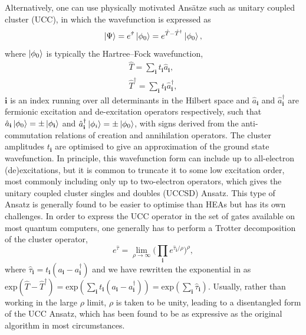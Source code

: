 \documentclass[%
 reprint,
 amsmath,amssymb,
 aps,
]{revtex4-2}
\begin{document}
Alternatively, one can use physically motivated Ans\"atze such as unitary coupled cluster (UCC),\cite{Kutzelnigg1982,Kutzelnigg1983,Kutzelnigg1984,Bartlett1989} in which the wavefunction is expressed as
\begin{equation}
\ket{\Psi} = e^{\hat \tau}\ket{\phi_0} = e^{\hat T - \hat T^\dagger}\ket{\phi_0},
\label{eq:UCC}
\end{equation}
where { $\ket{\phi_0}$ is typically the Hartree--Fock wavefunction,}
\begin{align}
\hat T = \sum_\mathbf{i} t_\mathbf{i} \hat a_\mathbf{i},\\
\hat T^\dagger = \sum_\mathbf{i} t_\mathbf{i} \hat a_\mathbf{i}^\dagger,
\end{align}
{$\mathbf{i}$ is an index running over all determinants in the Hilbert space and $\hat a_\mathbf{i}$ and $\hat a_\mathbf{i}^\dagger$ are  fermionic excitation and de-excitation operators respectively, such that ${\hat a_\mathbf{i}\ket{\phi_0} = \pm\ket{\phi_\mathbf{i}}}$ and ${\hat a_\mathbf{i}^\dagger\ket{\phi_i} = \pm\ket{\phi_0}}$, with signs derived from the anti-commutation relations of creation and annihilation operators. The cluster amplitudes $t_\mathbf{i}$ are optimised to give an approximation of the ground state wavefunction. In principle, this wavefunction form can include up to all-electron (de)excitations, but it is common to truncate it to some low excitation order, most commonly including only up to two-electron operators, which gives the unitary coupled cluster singles and doubles (UCCSD) Ansatz.} This type of Ansatz is generally found to be easier to optimise than HEAs but has its own challenges. In order to express the UCC operator in the set of gates available on most quantum computers, one generally has to perform a Trotter decomposition\cite{Trotter1959, Suzuki1976} of the cluster operator,
\begin{equation}
 e^{\hat \tau} = \lim_{\rho \rightarrow \infty}\Big(\prod_\mathbf{i} e^{\hat\tau_\mathbf{i}/\rho}\Big)^\rho,
\end{equation}
{ where $\hat \tau_\mathbf{i} = t_\mathbf{i}(a_\mathbf{i} - a_\mathbf{i}^\dagger)$ and we have rewritten the exponential in  as ${\mathrm{exp}(\hat T - \hat T^\dagger) = \mathrm{exp}(\sum_\mathbf{i} t_\mathbf{i}(a_\mathbf{i} - a_\mathbf{i}^\dagger)) = \mathrm{exp}(\sum_\mathbf{i}\hat\tau_\mathbf{i})}$.}
Usually, rather than working in the large $\rho$ limit, $\rho$ is taken to be unity, leading to a disentangled { form} of the UCC Ansatz, which has been found to be as expressive as the original algorithm in most circumstances.\cite{Evangelista2019}
\end{document}
